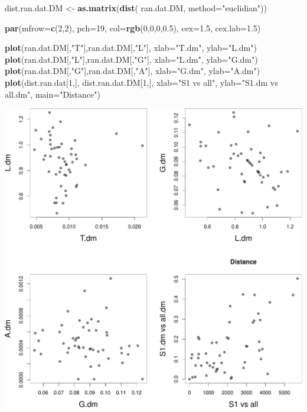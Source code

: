 \documentclass[twocolumn]{article}
\newenvironment{Shaded}{\begin{snugshade}}{\end{snugshade}}
\newcommand{\KeywordTok}[1]{\textcolor[rgb]{0.13,0.29,0.53}{\textbf{{#1}}}}
\newcommand{\DataTypeTok}[1]{\textcolor[rgb]{0.13,0.29,0.53}{{#1}}}
\newcommand{\DecValTok}[1]{\textcolor[rgb]{0.00,0.00,0.81}{{#1}}}
\newcommand{\FloatTok}[1]{\textcolor[rgb]{0.00,0.00,0.81}{{#1}}}
\newcommand{\StringTok}[1]{\textcolor[rgb]{0.31,0.60,0.02}{{#1}}}
\newcommand{\NormalTok}[1]{{#1}}
\begin{document}
\begin{Shaded}
\begin{Highlighting}[]
\NormalTok{dist.ran.dat.DM <-}\StringTok{ }\KeywordTok{as.matrix}\NormalTok{(}\KeywordTok{dist}\NormalTok{(}
    \NormalTok{ran.dat.DM, }\DataTypeTok{method=}\StringTok{"euclidian"}\NormalTok{))}

\KeywordTok{par}\NormalTok{(}\DataTypeTok{mfrow=}\KeywordTok{c}\NormalTok{(}\DecValTok{2}\NormalTok{,}\DecValTok{2}\NormalTok{), }\DataTypeTok{pch=}\DecValTok{19}\NormalTok{, }\DataTypeTok{col=}\KeywordTok{rgb}\NormalTok{(}\DecValTok{0}\NormalTok{,}\DecValTok{0}\NormalTok{,}\DecValTok{0}\NormalTok{,}\FloatTok{0.5}\NormalTok{),}
    \DataTypeTok{cex=}\FloatTok{1.5}\NormalTok{, }\DataTypeTok{cex.lab=}\FloatTok{1.5}\NormalTok{)}

\KeywordTok{plot}\NormalTok{(ran.dat.DM[,}\StringTok{"T"}\NormalTok{],ran.dat.DM[,}\StringTok{"L"}\NormalTok{],}
    \DataTypeTok{xlab=}\StringTok{"T.dm"}\NormalTok{, }\DataTypeTok{ylab=}\StringTok{"L.dm"}\NormalTok{)}
\KeywordTok{plot}\NormalTok{(ran.dat.DM[,}\StringTok{"L"}\NormalTok{],ran.dat.DM[,}\StringTok{"G"}\NormalTok{],}
    \DataTypeTok{xlab=}\StringTok{"L.dm"}\NormalTok{, }\DataTypeTok{ylab=}\StringTok{"G.dm"}\NormalTok{)}
\KeywordTok{plot}\NormalTok{(ran.dat.DM[,}\StringTok{"G"}\NormalTok{],ran.dat.DM[,}\StringTok{"A"}\NormalTok{],}
    \DataTypeTok{xlab=}\StringTok{"G.dm"}\NormalTok{, }\DataTypeTok{ylab=}\StringTok{"A.dm"}\NormalTok{)}
\KeywordTok{plot}\NormalTok{(dist.ran.dat[}\DecValTok{1}\NormalTok{,], dist.ran.dat.DM[}\DecValTok{1}\NormalTok{,],}
    \DataTypeTok{xlab=}\StringTok{"S1 vs all"}\NormalTok{, }\DataTypeTok{ylab=}\StringTok{"S1.dm vs all.dm"}\NormalTok{,}
    \DataTypeTok{main=}\StringTok{"Distance"}\NormalTok{)}
\end{Highlighting}
\end{Shaded}

\includegraphics{main_files/figure-latex/R_block_random_DM-1.pdf}
\end{document}
